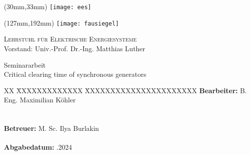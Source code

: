 \thispagestyle{empty}
\setcounter{page}{-1}

\begin{textblock*}{\textwidth}(30mm,33mm)
\texttt{[image: ees]}
\end{textblock*}

\begin{textblock*}{\textwidth}(127mm,192mm)
\texttt{[image: fausiegel]}
\end{textblock*}

{\raggedleft
\textsc{Lehrstuhl für Elektrische Energiesysteme}\\
Vorstand: Univ.-Prof. Dr.-Ing. Matthias Luther
\par}

\vspace{51mm}

{\centering

\large{Seminararbeit} \\	
\Large{Critical clearing time of synchronous generators}

\par}

\vspace{105mm}

{\raggedright
\begin{tabbing}
XX \= XXXXXXXXXXXXX \= XXXXXXXXXXXXXXXXXXXXXX \kill
		\> \textbf{Bearbeiter:} 	\> B. Eng. Maximilian Köhler \\
		\>								\\
 		\>												\>									\\
		\> \textbf{Betreuer:}		\> M. Sc. Ilya Burlakin \\
		\>												\>									\\
		\> \textbf{Abgabedatum:}	.2024															
\end{tabbing}
\par}
\cleardoublepage